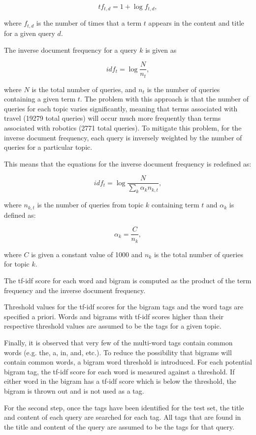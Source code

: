 \documentclass{article}
\def\eqstart{\begin{equation}}
\def\eqend{\end{equation}}
\begin{document}
\eqstart
\label{eq:tf}
tf_{t,d} = 1 + \log{f_{t,d}},
\eqend

where \(f_{t,d}\) is the number of times that a term \(t\) appears in the
content and title for a given query \(d\).

The inverse document frequency for a query \(k\) is given as

\eqstart
idf_{t} = \log{\frac{N}{n_{t}}},
\eqend

where \(N\) is the total number of queries, and \(n_{t}\) is the number of
queries containing a given term \(t\). The problem with this approach is that
the number of queries for each topic varies significantly, meaning that terms
associated with travel (19279 total queries) will occur much more frequently
than terms associated with robotics (2771 total queries). To mitigate this
problem, for the inverse document frequency, each query is inversely weighted
by the number of queries for a particular topic. 

This means that the equations for the inverse document frequency is redefined
as: 

\eqstart
\label{eq:idf}
idf_{t} = \log{\frac{N}{\sum_k \alpha_k n_{k,t}}},
\eqend

where \(n_{k,t}\) is the number of queries from topic \(k\) containing term
\(t\) and \(\alpha_k\) is defined as:

\eqstart
\alpha_k = \frac{C}{n_k},
\eqend

where \(C\) is given a constant value of 1000 and \(n_k\) is the total number
of queries for topic \(k\).

The tf-idf score for each word and bigram is computed as the product of the
term frequency and the inverse document frequency. 

Threshold values for the tf-idf scores for the bigram tags and the word tags
are specified a priori. Words and bigrams with tf-idf scores higher than their
respective threshold values are assumed to be the tags for a given topic. 

Finally, it is observed that very few of the multi-word tags contain common
words (e.g. the, a, in, and, etc.). To reduce the possibility that bigrams
will contain common words, a bigram word threshold is introduced. For each
potential bigram tag, the tf-idf score for each word is measured against a
threshold. If either word in the bigram has a tf-idf score which is below the
threshold, the bigram is thrown out and is not used as a tag.

For the second step, once the tags have been identified for the test set, the
title and content of each query are searched for each tag. All tags that are
found in the title and content of the query are assumed to be the tags for
that query.
\end{document}
